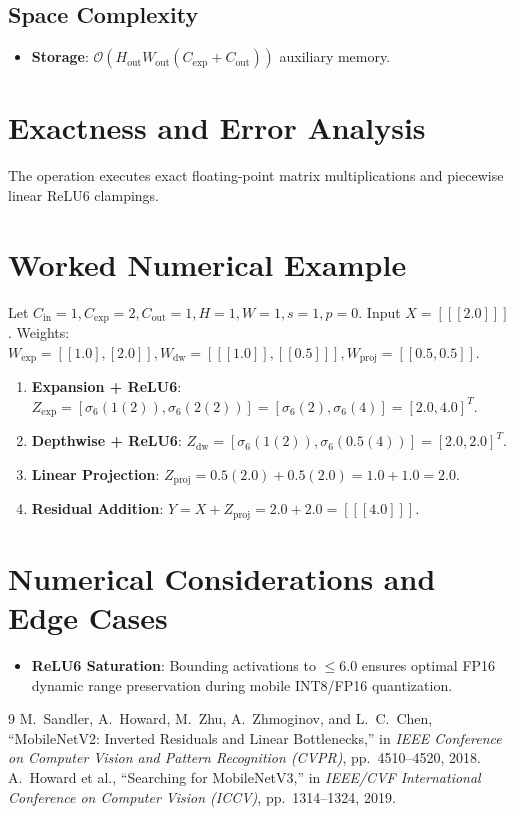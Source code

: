 \documentclass[11pt,a4paper]{article}
\theoremstyle{definition}
\begin{document}
\subsection{Space Complexity}
\begin{itemize}
    \item \textbf{Storage}: $\mathcal{O}(H_{\text{out}} W_{\text{out}} (C_{\text{exp}} + C_{\text{out}}))$ auxiliary memory.
\end{itemize}

\section{Exactness and Error Analysis}

The operation executes exact floating-point matrix multiplications and piecewise linear ReLU6 clampings.

\section{Worked Numerical Example}

Let $C_{\text{in}} = 1, C_{\text{exp}} = 2, C_{\text{out}} = 1, H = 1, W = 1, s = 1, p = 0$.
Input $X = [[[2.0]]]$.
Weights: $W_{\text{exp}} = [[1.0], [2.0]], W_{\text{dw}} = [[[1.0]], [[0.5]]], W_{\text{proj}} = [[0.5, 0.5]]$.

\begin{enumerate}
    \item \textbf{Expansion + ReLU6}:
    $Z_{\text{exp}} = [\sigma_6(1(2)), \sigma_6(2(2))] = [\sigma_6(2), \sigma_6(4)] = [2.0, 4.0]^T$.
    \item \textbf{Depthwise + ReLU6}:
    $Z_{\text{dw}} = [\sigma_6(1(2)), \sigma_6(0.5(4))] = [2.0, 2.0]^T$.
    \item \textbf{Linear Projection}:
    $Z_{\text{proj}} = 0.5(2.0) + 0.5(2.0) = 1.0 + 1.0 = 2.0$.
    \item \textbf{Residual Addition}:
    $Y = X + Z_{\text{proj}} = 2.0 + 2.0 = [[[4.0]]]$.
\end{enumerate}

\section{Numerical Considerations and Edge Cases}

\begin{itemize}
    \item \textbf{ReLU6 Saturation}: Bounding activations to $\le 6.0$ ensures optimal FP16 dynamic range preservation during mobile INT8/FP16 quantization.
\end{itemize}

\begin{thebibliography}{9}
 M.~Sandler, A.~Howard, M.~Zhu, A.~Zhmoginov, and L.~C.~Chen, ``MobileNetV2: Inverted Residuals and Linear Bottlenecks,'' in \emph{IEEE Conference on Computer Vision and Pattern Recognition (CVPR)}, pp.~4510--4520, 2018.
 A.~Howard et al., ``Searching for MobileNetV3,'' in \emph{IEEE/CVF International Conference on Computer Vision (ICCV)}, pp.~1314--1324, 2019.
\end{thebibliography}
\end{document}
